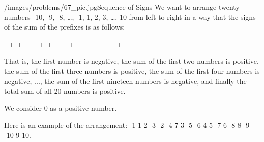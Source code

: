 \begin{problem}{/images/problems/67_pic.jpg}{Sequence of Signs} We want to arrange twenty numbers -10, -9, -8, \ldots, -1, 1, 2, 3, \ldots, 10 from left to right in a way that the signs of the sum of the prefixes is as follows:
	
\textsf{- + + - - - + + - - - + - + - + - - - +}
	
That is, the first number is negative, the sum of the first two numbers is positive, the sum of the first three numbers is positive, the sum of the first four numbers is negative, ..., the sum of the first nineteen numbers is negative, and finally the total sum of all 20 numbers is positive.

We consider 0 as a positive number.
\end{problem}

\begin{solution}
Here is an example of the arrangement: -1 1 2 -3 -2 -4 7 3 -5 -6 4 5 -7 6 -8 8 -9 -10 9 10.
\end{solution}

